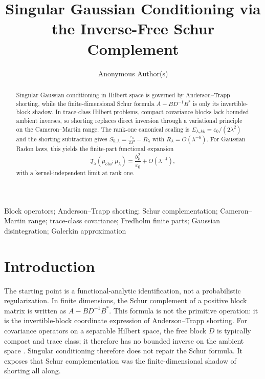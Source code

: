\documentclass[preprint,12pt]{elsarticle}
\theoremstyle{plain}
\theoremstyle{definition}
\theoremstyle{remark}
\begin{document}
\begin{frontmatter}

\title{Singular Gaussian Conditioning via the Inverse-Free Schur Complement}

\author{Anonymous Author(s)}

\begin{abstract}
        Singular Gaussian conditioning in Hilbert space is governed by
        Anderson--Trapp shorting, while the finite-dimensional Schur formula
        $A-BD^{-1}B^*$ is only its invertible-block shadow.  In trace-class
        Hilbert problems, compact covariance blocks lack bounded ambient inverses,
        so shorting replaces direct inversion through a variational principle on
        the Cameron--Martin range.  The rank-one canonical scaling is
        $\Sigma_{\lambda,kk}=\varepsilon_0/(2\lambda^2)$ and the shorting
        subtraction gives $S_{k,\lambda}=\frac{\varepsilon_0}{2\lambda^2}-R_\lambda$
        with $R_\lambda=O(\lambda^{-6})$.
        For Gaussian Radon laws, this yields the finite-part functional expansion
        \[
        \mathfrak{J}_\lambda(\mu_{\mathrm{obs}};\mu_\lambda)
        =
        \frac{b_k^2}{\varepsilon_0}+O(\lambda^{-4}),
        \]
        with a kernel-independent limit at rank one.
    \end{abstract}

    \begin{keyword}
Block operators; Anderson--Trapp shorting; Schur complementation; Cameron--Martin range; trace-class covariance; Fredholm finite parts; Gaussian disintegration; Galerkin approximation
\end{keyword}

\end{frontmatter}

    \section{Introduction}
    \label{sec:intro}

    The starting point is a functional-analytic identification, not a
    probabilistic regularization.  In finite dimensions, the Schur complement
    of a positive block matrix is written as $A-BD^{-1}B^*$.  This formula is
    not the primitive operation: it is the invertible-block coordinate
    expression of Anderson--Trapp shorting.  For covariance operators on a
    separable Hilbert space, the free block $D$ is typically compact and trace
    class; it therefore has no bounded inverse on the ambient space
    \cite{bogachev1998gaussian,simon2005trace,daprato2014stochastic,jorgensentian2024hilbert}.  Singular
    conditioning therefore does not repair the Schur formula.  It exposes that
    Schur complementation was the finite-dimensional shadow of shorting all
    along.
\end{document}
